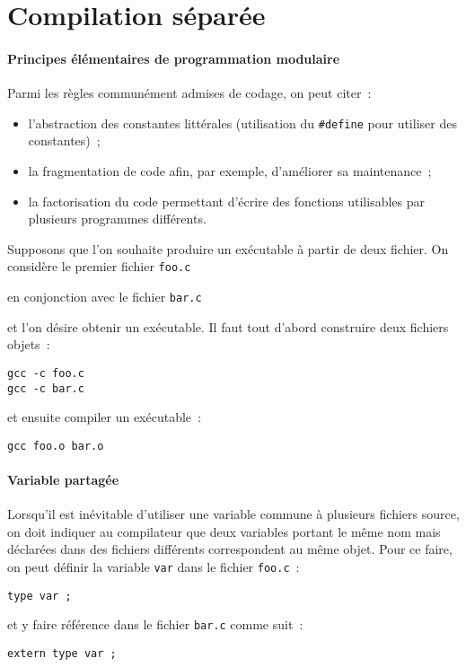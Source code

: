 \section{Compilation s\'epar\'ee}
\label{sec:CompilationSeparee}

\paragraph{Principes \'el\'ementaires de programmation modulaire}
Parmi les r\`egles commun\'ement admises de codage, on peut citer~:
\begin{itemize}
\item  l'abstraction   des  constantes  litt\'erales   (utilisation du
  \verb+#define+ pour utiliser des constantes)~;
\item la  fragmentation  de code  afin,  par exemple, d'am\'eliorer sa
  maintenance~;
\item la factorisation   du code permettant  d'\'ecrire des  fonctions
  utilisables par plusieurs programmes diff\'erents.
\end{itemize}
Supposons que  l'on  souhaite produire  un  ex\'ecutable \`a partir de
deux fichier. On consid\`ere le premier fichier \texttt{foo.c}



en conjonction avec le fichier \texttt{bar.c}



et l'on d\'esire obtenir     un ex\'ecutable. Il faut  tout    d'abord
construire deux fichiers objets~:
\begin{verbatim}
gcc -c foo.c
gcc -c bar.c
\end{verbatim}
et ensuite compiler un ex\'ecutable~:
\begin{verbatim}
gcc foo.o bar.o
\end{verbatim}
\paragraph{Variable partag\'ee}
Lorsqu'il   est  in\'evitable d'utiliser  une   variable   commune \`a
plusieurs  fichiers source, on doit  indiquer  au compilateur que deux
variables  portant le m\^eme nom  mais d\'eclar\'ees dans des fichiers
diff\'erents correspondent  au m\^eme objet.  Pour   ce faire, on peut
d\'efinir la variable \texttt{var} dans le fichier \texttt{foo.c}~:
\begin{verbatim}
type var ;
\end{verbatim}
et y faire r\'ef\'erence dans le fichier \texttt{bar.c} comme suit~:
\begin{verbatim}
extern type var ;
\end{verbatim}
